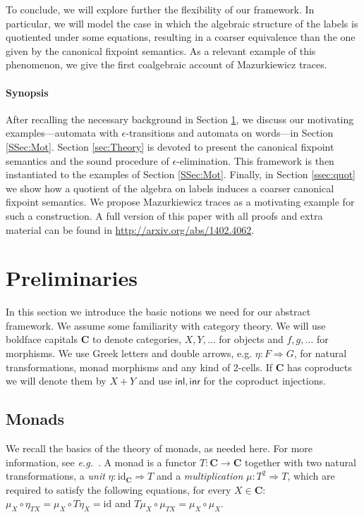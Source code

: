 \documentclass[oribibl,envcountsame,envcountsect,runningheads]{llncs}
\newcommand{\after}{\mathrel{\circ}}
\newcommand{\idmap}{\textrm{id}}
\newcommand{\cat}[1]{\ensuremath{\mathbf{#1}}}
\renewcommand{\>}{\rangle}
\def\id{\mathrm{id}}
\def\inl{\mathsf{inl}}
\def\inr{\mathsf{inr}}
\def\To{\Rightarrow}
\begin{document}
To conclude, we will explore further the flexibility of our framework. In particular, we will model the case in which the algebraic structure of the labels is quotiented under some equations, resulting in a coarser equivalence than the one given by the canonical fixpoint semantics. As a relevant example of this phenomenon, we give the first coalgebraic account of Mazurkiewicz traces.

\paragraph{Synopsis} After recalling the necessary background in Section \ref{Sec:Trace}, we discuss our motivating examples---automata with $\epsilon$-transitions and automata on words---in Section \ref{SSec:Mot}. Section \ref{sec:Theory} is devoted to present the canonical fixpoint semantics and the sound procedure of $\epsilon$-elimination. This framework is then instantiated to the examples of Section \ref{SSec:Mot}. Finally, in Section \ref{ssec:quot} we show how a quotient of the algebra on labels induces a coarser canonical fixpoint semantics. We propose Mazurkiewicz traces as a motivating example for such a construction. A full version of this paper with all proofs and extra material can be found in \url{http://arxiv.org/abs/1402.4062}.





\section{Preliminaries}\label{Sec:Trace}
In this section we introduce the basic notions we need for our abstract framework. We assume some familiarity with
category theory. We will use boldface capitals $\cat{C}$ to denote categories, $X, Y, \ldots$ for objects and $f,g,\ldots$ for morphisms.
We use Greek letters and double arrows, e.g. $\eta \colon F \To G$, for natural transformations, monad morphisms and any kind of 2-cells. If $\mathbf{C}$ has coproducts we will denote them by $X+Y$ and use $\inl,\inr$ for the coproduct injections.


\subsection{Monads}

We recall the basics of the theory of monads, as needed here. For more information, see \textit{e.g.}~\cite{MacLane71}. A monad is a functor $T\colon\cat{C} \rightarrow \cat{C}$ together with two natural transformations, a \emph{unit} $\eta\colon \idmap_{\cat{C}} \To T$ and a \emph{multiplication} $\mu \colon T^{2} \To T$, which are required to satisfy the following equations, for every $X\in\cat{C}$: $\mu_X\after\eta_{T X} = \mu_X\after T\eta_{X} = \id$ and $T\mu_{X}\after \mu_{T X} = \mu_X\after \mu_X$.
\end{document}
